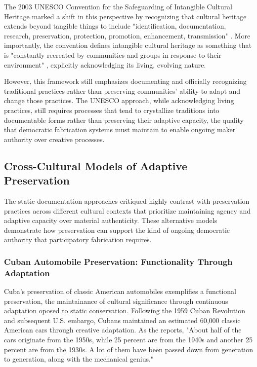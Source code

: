 The 2003 UNESCO Convention for the Safeguarding of Intangible Cultural Heritage marked a shift in this perspective by recognizing that cultural heritage extends beyond tangible things to include "identification, documentation, research, preservation, protection, promotion, enhancement, transmission" \citep{unesco2003}. More importantly, the convention defines intangible cultural heritage as something that is "constantly recreated by communities and groups in response to their environment" \citep{unesco2003}, explicitly acknowledging its living, evolving nature.

\vspace{0.5cm}

However, this framework still emphasizes documenting and officially recognizing traditional practices rather than preserving communities' ability to adapt and change those practices. The UNESCO approach, while acknowledging living practices, still requires processes that tend to crystallize traditions into documentable forms rather than preserving their adaptive capacity, the quality that democratic fabrication systems must maintain to enable ongoing maker authority over creative processes.

\subsection{Cross-Cultural Models of Adaptive Preservation}

The static documentation approaches critiqued highly contrast with preservation practices across different cultural contexts that prioritize maintaining agency and adaptive capacity over material authenticity. These alternative models demonstrate how preservation can support the kind of ongoing democratic authority that participatory fabrication requires.

\subsubsection{Cuban Automobile Preservation: Functionality Through Adaptation}

Cuba's preservation of classic American automobiles exemplifies a functional preservation, the maintainance of cultural significance through continuous adaptation oposed to static conservation. Following the 1959 Cuban Revolution and subsequent U.S. embargo, Cubans maintained an estimated 60,000 classic American cars through creative adaptation. As the \citet{diplomatictimes2019} reports, "About half of the cars originate from the 1950s, while 25 percent are from the 1940s and another 25 percent are from the 1930s. A lot of them have been passed down from generation to generation, along with the mechanical genius."

